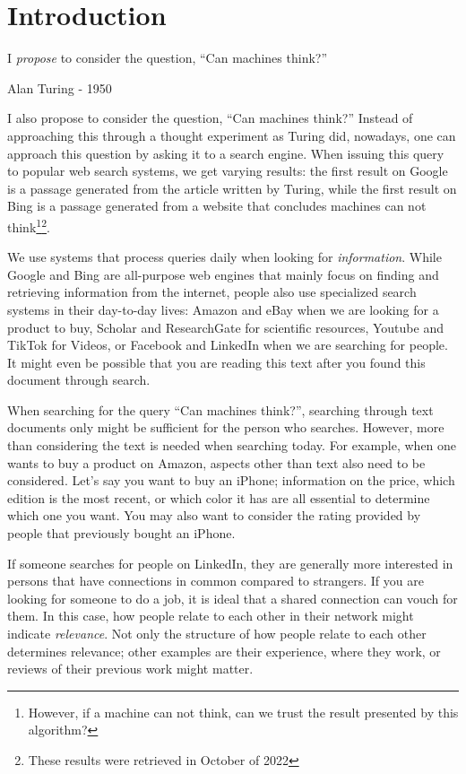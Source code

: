\chapter{Introduction}
\epigraph{I \textit{propose} to consider the question, ``Can machines think?''}{Alan Turing - 1950}

I also propose to consider the question, ``Can machines think?'' Instead of approaching this through a thought experiment as Turing did, nowadays, one can approach this question by asking it to a search engine. When issuing this query to popular web search systems, we get varying results: the first result on Google is a passage generated from the article written by Turing, while the first result on Bing is a passage generated from a website that concludes machines can not think\footnote{However, if a machine can not think, can we trust the result presented by this algorithm?}\footnote{These results were retrieved in October of 2022}.

We use systems that process queries daily when looking for \textit{information}. While Google and Bing are all-purpose web engines that mainly focus on finding and retrieving information from the internet, people also use specialized search systems in their day-to-day lives: Amazon and eBay when we are looking for a product to buy, Scholar and ResearchGate for scientific resources, Youtube and TikTok for Videos, or Facebook and LinkedIn when we are searching for people. It might even be possible that you are reading this text after you found this document through search. 

When searching for the query ``Can machines think?'', searching through text documents only might be sufficient for the person who searches. However, more than considering the text is needed when searching today. For example, when one wants to buy a product on Amazon, aspects other than text also need to be considered. Let's say you want to buy an iPhone; information on the price, which edition is the most recent, or which color it has are all essential to determine which one you want. You may also want to consider the rating provided by people that previously bought an iPhone.

If someone searches for people on LinkedIn, they are generally more interested in persons that have connections in common compared to strangers. If you are looking for someone to do a job, it is ideal that a shared connection can vouch for them. In this case, how people relate to each other in their network might indicate \textit{relevance}. Not only the structure of how people relate to each other determines relevance; other examples are their experience, where they work, or reviews of their previous work might matter.

